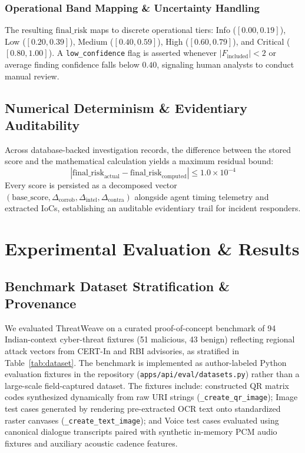 \documentclass[conference]{IEEEtran}
\begin{document}
\subsubsection{Operational Band Mapping \& Uncertainty Handling}
The resulting $\text{final\_risk}$ maps to discrete operational tiers: Info ($[0.00, 0.19]$), Low ($[0.20, 0.39]$), Medium ($[0.40, 0.59]$), High ($[0.60, 0.79]$), and Critical ($[0.80, 1.00]$). A \texttt{low\_confidence} flag is asserted whenever $|F_{\text{included}}| < 2$ or average finding confidence falls below $0.40$, signaling human analysts to conduct manual review.

\subsection{Numerical Determinism \& Evidentiary Auditability}
Across database-backed investigation records, the difference between the stored score and the mathematical calculation yields a maximum residual bound:
\begin{equation}
|\text{final\_risk}_{\text{actual}} - \text{final\_risk}_{\text{computed}}| \le 1.0 \times 10^{-4}
\end{equation}
Every score is persisted as a decomposed vector $(\text{base\_score}, \Delta_{\text{corrob}}, \Delta_{\text{intel}}, \Delta_{\text{contra}})$ alongside agent timing telemetry and extracted IoCs, establishing an auditable evidentiary trail for incident responders.

\section{Experimental Evaluation \& Results}
\subsection{Benchmark Dataset Stratification \& Provenance}
We evaluated ThreatWeave on a curated proof-of-concept benchmark of 94 Indian-context cyber-threat fixtures (51 malicious, 43 benign) reflecting regional attack vectors from CERT-In and RBI advisories, as stratified in Table~\ref{tab:dataset}. The benchmark is implemented as author-labeled Python evaluation fixtures in the repository (\texttt{apps/\allowbreak api/\allowbreak eval/\allowbreak datasets.py}) rather than a large-scale field-captured dataset. The fixtures include: constructed QR matrix codes synthesized dynamically from raw URI strings (\texttt{\_create\_\allowbreak qr\_\allowbreak image}); Image test cases generated by rendering pre-extracted OCR text onto standardized raster canvases (\texttt{\_create\_\allowbreak text\_\allowbreak image}); and Voice test cases evaluated using canonical dialogue transcripts paired with synthetic in-memory PCM audio fixtures and auxiliary acoustic cadence features.
\end{document}
